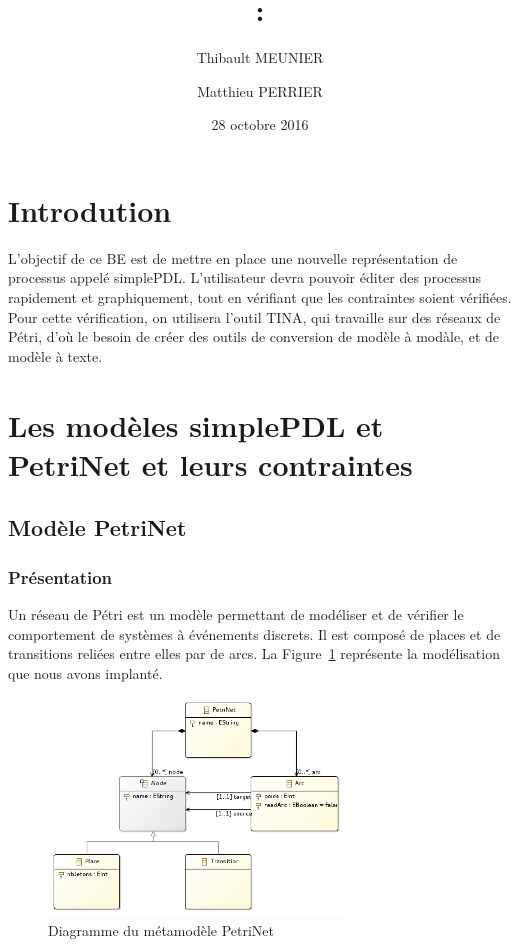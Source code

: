 \documentclass[12pt]{article}
\title{\Matiere:\\ \titre}
\author{Thibault MEUNIER \and Matthieu PERRIER}
\date{28 octobre 2016}
\begin{document}
\maketitle

\setcounter{page}{0}
\thispagestyle{empty} %

\newpage

\section*{Introdution}
L'objectif de ce BE est de mettre en place une nouvelle représentation de processus appelé simplePDL. L'utilisateur devra pouvoir éditer des processus rapidement et graphiquement, tout en vérifiant que les contraintes soient vérifiées.
Pour cette vérification, on utilisera l'outil TINA, qui travaille sur des réseaux de Pétri, d'où le besoin de créer des outils de conversion de modèle à modàle, et de modèle à texte.


\renewcommand{\contentsname}{Sommaire}
\setcounter{tocdepth}{2}
\tableofcontents
\newpage

\section{Les modèles simplePDL et PetriNet et leurs contraintes}
\subsection{Modèle PetriNet}
\subsubsection{Présentation}
Un réseau de Pétri est un modèle permettant de modéliser et de vérifier le comportement de systèmes à événements discrets. Il est composé de places et de transitions reliées entre elles par de arcs. La Figure~\ref{fig:PetriNet} représente la modélisation que nous avons implanté.
\begin{figure}[!h]
  \centering
  \includegraphics[width=0.7\textwidth]{PetriNet.png}
  \caption{Diagramme du métamodèle PetriNet}\label{fig:PetriNet} 
\end{figure}
\end{document}
